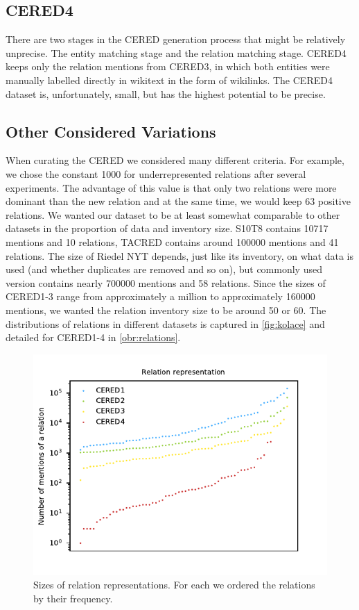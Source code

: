 \subsection{CERED4}
There are two stages in the CERED generation process that might be relatively unprecise. The entity matching stage and the relation matching stage. CERED4 keeps only the relation mentions from CERED3, in which both entities were manually labelled directly in wikitext in the form of wikilinks. The CERED4 dataset is, unfortunately, small, but has the highest potential to be precise.


\subsection{Other Considered Variations}
\label{sec:otherconsideredvariations}
When curating the CERED we considered many different criteria. For example, we chose the constant \num{1000} for underrepresented relations after several experiments. The advantage of this value is that only two relations were more dominant than the new  relation and at the same time, we would keep 63 positive relations. We wanted our dataset to be at least somewhat comparable to other datasets in the proportion of data and inventory size. S10T8 contains \num{10717} mentions and 10 relations, TACRED contains around \num{100000} mentions and 41 relations. The size of Riedel NYT depends, just like its inventory, on what data is used (and whether duplicates are removed and so on), but commonly used version contains nearly \num{700000} mentions and 58 relations. Since the sizes of CERED1-3 range from approximately a million to approximately \num{160000} mentions, we wanted the relation inventory size to be around 50 or 60. The distributions of relations in different datasets is captured in \autoref{fig:kolace} and detailed for CERED1-4 in \autoref{obr:relations}.







\begin{figure}[h]\centering
\includegraphics[scale=1]{./img/Relations1-4}
\caption{Sizes of relation representations. For each we ordered the relations by their frequency.}
\label{obr:relations}
\end{figure}

